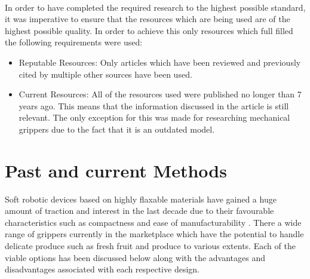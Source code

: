 \documentclass[11pt,twocolumn]{article}
\begin{document}
\\
\newline
In order to have completed the required research to the highest possible standard, it was imperative to ensure that the resources which are being used are of the highest possible quality. In order to achieve this only resources which full filled the following requirements were used:
\begin{itemize}
\item Reputable Resources: Only articles which have been reviewed and previously cited by multiple other sources have been used.
\item Current Resources: All of the resources used were published no longer than 7 years ago. This means that the information discussed in the article is still relevant. The only exception for this was made for researching mechanical grippers due to the fact that it is an outdated model.
\end{itemize}
\section{Past and current Methods}
Soft robotic devices based on highly flaxable materials have gained a huge amount of traction and interest in the last decade due to their favourable characteristics such as compactness and ease of manufacturability \cite{mutlu2013electroactive}. There a wide range of grippers currently in the marketplace which have the potential to handle delicate produce such as fresh fruit and produce to various extents. Each of the viable options has been discussed below along with the advantages and disadvantages associated with each respective design.
\end{document}
